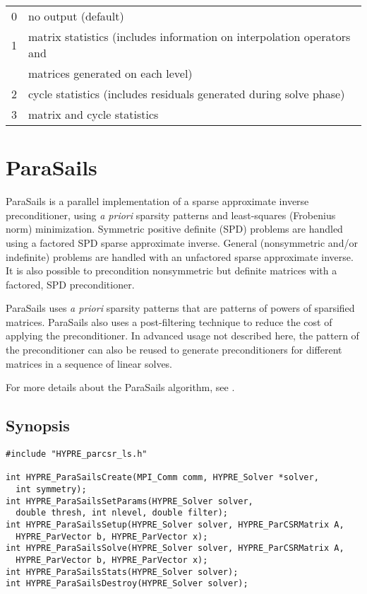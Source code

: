 \begin{tabular}{l l}
 0 & no output (default) \\
 1 & matrix statistics (includes information on interpolation operators and \\
 & matrices generated on each level) \\
 2 & cycle statistics (includes residuals generated during solve phase) \\
 3 & matrix and cycle statistics \\
\end{tabular}


\section{ParaSails}

ParaSails is a parallel implementation of a sparse approximate inverse
preconditioner, using {\em a priori} sparsity patterns and least-squares
(Frobenius norm) minimization.  Symmetric positive definite (SPD) problems
are handled using a factored SPD sparse approximate inverse.  General
(nonsymmetric and/or indefinite) problems are handled with an
unfactored sparse approximate inverse.  It is also possible to
precondition nonsymmetric but definite matrices with a factored, SPD
preconditioner.

ParaSails uses {\em a priori} sparsity patterns that are patterns of powers
of sparsified matrices.  ParaSails also uses a post-filtering technique
to reduce the cost of applying the preconditioner.  
In advanced usage not described here, the pattern of the
preconditioner can also be reused to generate preconditioners for different
matrices in a sequence of linear solves.

For more details about the ParaSails algorithm, see \cite{EChow_2000}.


\subsection{Synopsis}

\begin{display}
\begin{verbatim}
#include "HYPRE_parcsr_ls.h"

int HYPRE_ParaSailsCreate(MPI_Comm comm, HYPRE_Solver *solver, 
  int symmetry);
int HYPRE_ParaSailsSetParams(HYPRE_Solver solver, 
  double thresh, int nlevel, double filter);
int HYPRE_ParaSailsSetup(HYPRE_Solver solver, HYPRE_ParCSRMatrix A,
  HYPRE_ParVector b, HYPRE_ParVector x);
int HYPRE_ParaSailsSolve(HYPRE_Solver solver, HYPRE_ParCSRMatrix A,
  HYPRE_ParVector b, HYPRE_ParVector x);
int HYPRE_ParaSailsStats(HYPRE_Solver solver);
int HYPRE_ParaSailsDestroy(HYPRE_Solver solver);
\end{verbatim}
\end{display}

